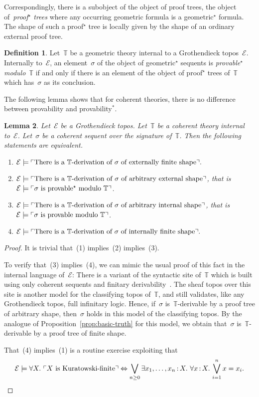 \documentclass[oneside,reqno]{amsart}
\theoremstyle{definition}
\newtheorem{defn}{Definition}[section]
\theoremstyle{plain}
\newtheorem{lemma}[defn]{Lemma}
\theoremstyle{remark}
\newcommand{\E}{\mathcal{E}}
\newcommand{\TT}{\mathbb{T}}
\renewcommand{\_}{\mathpunct{.}\,}
\newcommand{\?}{\,{:}\,}
\newcommand{\speak}[1]{\ulcorner\text{\textnormal{#1}}\urcorner}
\begin{document}
Correspondingly, there is a subobject of the object of proof trees, the object
of~\emph{proof$^\star$ trees} where any occurring geometric formula is a
geometric$^\star$ formula. The shape of such a proof$^\star$ tree is locally
given by the shape of an ordinary external proof tree.

\begin{defn}\label{defn:provability*}
Let~$\TT$ be a geometric theory internal to a Grothendieck topos~$\E$.
Internally to~$\E$, an element~$\sigma$ of the object of geometric$^\star$
sequents is \emph{provable$^\star$ modulo~$\TT$} if and only if there is an
element of the object of proof$^\star$ trees of~$\TT$ which has~$\sigma$ as its
conclusion.\end{defn}

The following lemma shows that for coherent theories, there is no difference
between provability and provability$^*$.

\begin{lemma}Let~$\E$ be a Grothendieck topos. Let~$\TT$ be a coherent theory
internal to~$\E$. Let~$\sigma$ be a coherent sequent over the signature
of~$\TT$. Then the following statements are equivalent.
\begin{enumerate}
\item $\E \models \speak{There is a~$\TT$-derivation of~$\sigma$ of externally
finite shape}.$
\item $\E \models \speak{There is a~$\TT$-derivation of~$\sigma$ of arbitrary
external shape}$, that is~$\E \models \speak{$\sigma$ is provable$^\star$
modulo~$\TT$}$.
\item $\E \models \speak{There is a~$\TT$-derivation of~$\sigma$ of arbitrary
internal shape}$, that is~$\E \models \speak{$\sigma$ is provable
modulo~$\TT$}$.
\item $\E \models \speak{There is a~$\TT$-derivation of~$\sigma$ of internally
finite shape}.$
\end{enumerate}
\end{lemma}

\begin{proof}It is trivial that~(1) implies~(2) implies~(3).

To verify that~(3) implies~(4), we can mimic the usual proof of this fact in
the internal language of~$\E$: There is a variant of the syntactic
site of~$\TT$ which is built using only coherent sequents and finitary
derivability~\cite[Section~1.4]{caramello:tst}. The sheaf topos over this site
is another model for the classifying topos of~$\TT$, and still validates, like
any Grothendieck topos, full infinitary logic. Hence, if~$\sigma$
is~$\TT$-derivable by a proof tree of arbitrary shape, then~$\sigma$ holds in
this model of the classifying topos. By the analogue of
Proposition~\ref{prop:basic-truth} for this model, we obtain
that~$\sigma$ is~$\TT$-derivable by a proof tree of finite shape.

That~(4) implies~(1) is a routine exercise exploiting that
\[ \E \models \forall X\_ \speak{$X$ is Kuratowski-finite} \Leftrightarrow
  \bigvee_{n \geq 0} \exists x_1,\ldots,x_n \? X\_
  \forall x \? X\_ \bigvee_{i=1}^n x = x_i. \qedhere \]
\end{proof}
\end{document}
